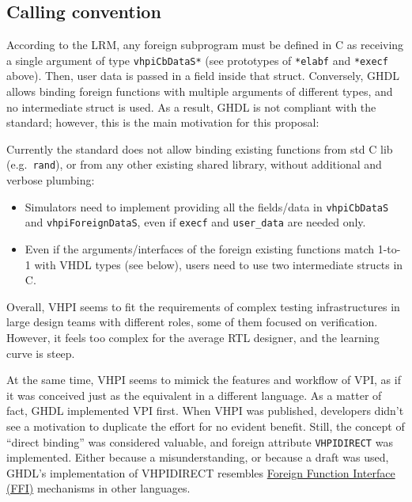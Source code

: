 \documentclass[
]{article}
\providecommand{\tightlist}{%
  \setlength{\itemsep}{0pt}\setlength{\parskip}{0pt}}
\begin{document}
\hypertarget{calling-convention}{%
\subsection{Calling convention}\label{calling-convention}}

According to the LRM, any foreign subprogram must be defined in C as receiving a single argument of type \texttt{vhpiCbDataS*} (see prototypes of \texttt{*elabf} and \texttt{*execf} above). Then, user data is passed in a field inside that struct. Conversely, GHDL allows binding foreign functions with multiple arguments of different types, and no intermediate struct is used. As a result, GHDL is not compliant with the standard; however, this is the main motivation for this proposal:

Currently the standard does not allow binding existing functions from std C lib (e.g.~\texttt{rand}), or from any other existing shared library, without additional and verbose plumbing:

\begin{itemize}
\tightlist
\item
  Simulators need to implement providing all the fields/data in \texttt{vhpiCbDataS} and \texttt{vhpiForeignDataS}, even if \texttt{execf} and \texttt{user\_data} are needed only.
\item
  Even if the arguments/interfaces of the foreign existing functions match 1-to-1 with VHDL types (see below), users need to use two intermediate structs in C.
\end{itemize}

Overall, VHPI seems to fit the requirements of complex testing infrastructures in large design teams with different roles, some of them focused on verification. However, it feels too complex for the average RTL designer, and the learning curve is steep.

At the same time, VHPI seems to mimick the features and workflow of VPI, as if it was conceived just as the equivalent in a different language. As a matter of fact, GHDL implemented VPI first. When VHPI was published, developers didn't see a motivation to duplicate the effort for no evident benefit. Still, the concept of ``direct binding'' was considered valuable, and foreign attribute \texttt{VHPIDIRECT} was implemented. Either because a misunderstanding, or because a draft was used, GHDL's implementation of VHPIDIRECT resembles \href{https://en.wikipedia.org/wiki/Foreign_function_interface}{Foreign Function Interface (FFI)} mechanisms in other languages.
\end{document}
